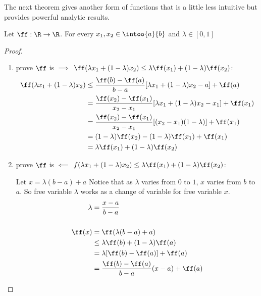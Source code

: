 The next theorem gives another form of  functions that is a little
less intuitive but provides powerful analytic results.
\begin{theorem}
\label{thm:convex_lambda}
Let $\ff:\R\to\R$.
For every $x_1,x_2\in\intoo{a}{b}$ and $\lambda\in[0,1]$
\end{theorem}
\begin{proof}
\begin{enumerate}
  \item prove $\ff$ is  $\implies$
        $\ff(\lambda x_1+(1-\lambda)x_2) \le \lambda\ff(x_1) + (1-\lambda)\ff(x_2)$:
  \begin{align*}
    \ff(\lambda x_1+(1-\lambda)x_2)
      &\le \frac{\ff(b)-\ff(a)}{b-a}[\lambda x_1+(1-\lambda)x_2-a] + \ff(a)
    \\&=   \frac{\ff(x_2)-\ff(x_1)}{x_2-x_1}[\lambda x_1+(1-\lambda)x_2-x_1] + \ff(x_1)
    \\&=   \frac{\ff(x_2)-\ff(x_1)}{x_2-x_1}[(x_2-x_1)(1-\lambda)] + \ff(x_1)
    \\&=   (1-\lambda)\ff(x_2)-(1-\lambda)\ff(x_1) + \ff(x_1)
    \\&=   \lambda\ff(x_1) + (1-\lambda)\ff(x_2)
  \end{align*}
  \item prove $\ff$ is  $\impliedby$
        $f(\lambda x_1+(1-\lambda)x_2) \le \lambda\ff(x_1) + (1-\lambda)\ff(x_2)$:

  Let $x=\lambda(b-a)+a$ Notice that as $\lambda$ varies from $0$ to $1$,
      $x$ varies from $b$ to $a$.
      So free variable $\lambda$ works as a change of variable for
      free variable $x$.
  \begin{align*}
    \lambda &= \frac{x-a}{b-a} \\
\\
    \ff(x)
      &=   \ff(\lambda(b-a)+a)
    \\&\le \lambda\ff(b) + (1-\lambda)\ff(a)
    \\&=   \lambda[\ff(b)-\ff(a)] + \ff(a)
    \\&=   \frac{\ff(b)-\ff(a)}{b-a}(x-a) + \ff(a)
  \end{align*}
\end{enumerate}
\end{proof}

